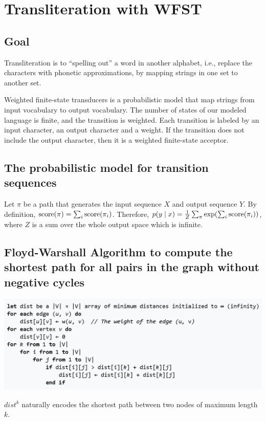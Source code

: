 \section{Transliteration with WFST}

\subsection*{Goal}

Transliteration is to ``spelling out'' a word in another alphabet, i.e., replace the characters with phonetic approximations, by mapping strings in one set to another set.

Weighted finite-state transducers is a probabilistic model that map strings from input vocabulary to output vocabulary. The number of states of our modeled language is finite, and the transition is weighted. Each transition is labeled by an input character, an output character and a weight. If the transition does not include the output character, then it is a weighted finite-state acceptor.

\subsection*{The probabilistic model for transition sequences}
Let $\pi$ be a path that generates the input sequence $X$ and output sequence $Y$. By definition, $\text{score}(\pi)=\sum_i \text{score}(\pi_i)$. Therefore, $p(y\mid x)=\frac{1}{Z} \sum_\pi \exp(\sum_i \text{score}(\pi_i))$, where $Z$ is a sum over the whole output space which is infinite.

\subsection*{Floyd-Warshall Algorithm to compute the shortest path for all pairs in the graph without negative cycles}

\includegraphics[width=\columnwidth]{img/Floyd_Warshall.png}

$dist^k$ naturally encodes the shortest path between two nodes of maximum length $k$.

